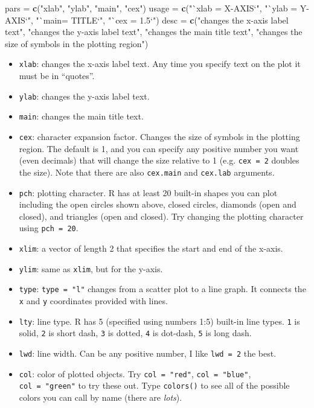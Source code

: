 \documentclass[]{book}
\newenvironment{Shaded}{\begin{snugshade}}{\end{snugshade}}
\newcommand{\KeywordTok}[1]{\textcolor[rgb]{0.13,0.29,0.53}{\textbf{#1}}}
\newcommand{\StringTok}[1]{\textcolor[rgb]{0.31,0.60,0.02}{#1}}
\newcommand{\NormalTok}[1]{#1}
\providecommand{\tightlist}{%
  \setlength{\itemsep}{0pt}\setlength{\parskip}{0pt}}
\theoremstyle{definition}
\theoremstyle{definition}
\theoremstyle{definition}
\theoremstyle{remark}
\begin{document}
\begin{Shaded}
\begin{Highlighting}[]
\NormalTok{pars =}\StringTok{ }\KeywordTok{c}\NormalTok{(}\StringTok{"xlab"}\NormalTok{, }\StringTok{"ylab"}\NormalTok{, }\StringTok{"main"}\NormalTok{, }\StringTok{"cex"}\NormalTok{)}
\NormalTok{usage =}\StringTok{ }\KeywordTok{c}\NormalTok{(}\StringTok{"`xlab = X-AXIS`"}\NormalTok{, }\StringTok{"`ylab = Y-AXIS`"}\NormalTok{, }\StringTok{"`main= TITLE`"}\NormalTok{, }\StringTok{"`cex = 1.5`"}\NormalTok{)}
\NormalTok{desc =}\StringTok{ }\KeywordTok{c}\NormalTok{(}\StringTok{"changes the x-axis label text"}\NormalTok{,}
         \StringTok{"changes the y-axis label text"}\NormalTok{,}
         \StringTok{"changes the main title text"}\NormalTok{,}
         \StringTok{"changes the size of symbols in the plotting region"}\NormalTok{)}
\end{Highlighting}
\end{Shaded}

\begin{itemize}
\tightlist
\item
  \texttt{xlab}: changes the x-axis label text. Any time you specify
  text on the plot it must be in ``quotes''.
\item
  \texttt{ylab}: changes the y-axis label text.
\item
  \texttt{main}: changes the main title text.
\item
  \texttt{cex}: character expansion factor. Changes the size of symbols
  in the plotting region. The default is 1, and you can specify any
  positive number you want (even decimals) that will change the size
  relative to 1 (e.g. \texttt{cex\ =\ 2} doubles the size). Note that
  there are also \texttt{cex.main} and \texttt{cex.lab} arguments.
\item
  \texttt{pch}: plotting character. R has at least 20 built-in shapes
  you can plot including the open circles shown above, closed circles,
  diamonds (open and closed), and triangles (open and closed). Try
  changing the plotting character using \texttt{pch\ =\ 20}.
\item
  \texttt{xlim}: a vector of length 2 that specifies the start and end
  of the x-axis.
\item
  \texttt{ylim}: same as \texttt{xlim}, but for the y-axis.
\item
  \texttt{type}: \texttt{type\ =\ "l"} changes from a scatter plot to a
  line graph. It connects the \texttt{x} and \texttt{y} coordinates
  provided with lines.
\item
  \texttt{lty}: line type. R has 5 (specified using numbers 1:5)
  built-in line types. \texttt{1} is solid, \texttt{2} is short dash,
  \texttt{3} is dotted, \texttt{4} is dot-dash, \texttt{5} is long dash.
\item
  \texttt{lwd}: line width. Can be any positive number, I like
  \texttt{lwd\ =\ 2} the best.
\item
  \texttt{col}: color of plotted objects. Try \texttt{col\ =\ "red"},
  \texttt{col\ =\ "blue"}, \texttt{col\ =\ "green"} to try these out.
  Type \texttt{colors()} to see all of the possible colors you can call
  by name (there are \emph{lots}).
\end{itemize}
\end{document}
